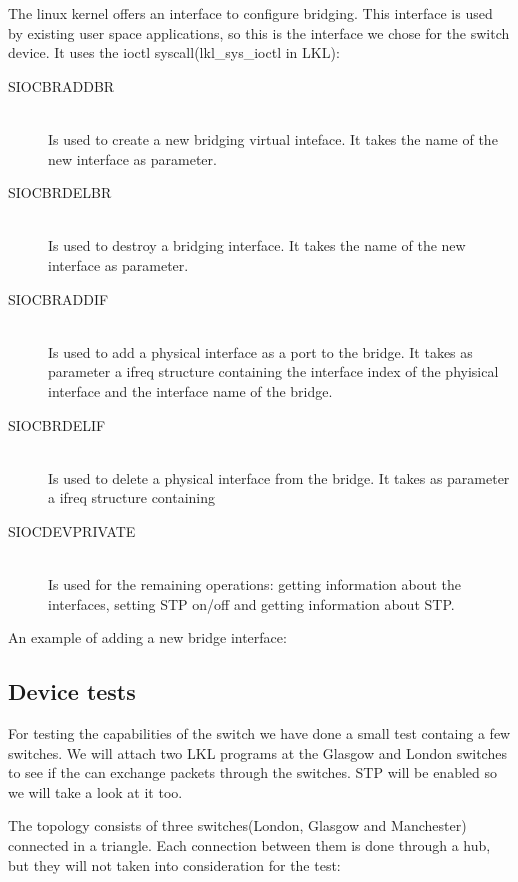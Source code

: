 The linux kernel offers an interface to configure bridging. This interface is used
by existing user space applications, so this is the interface we chose for the switch device. 
It uses the ioctl syscall(lkl_sys_ioctl in LKL):
\begin{description}
  \item[SIOCBRADDBR] \hfill \\
  Is used to create a new bridging virtual inteface. It takes the name of the new interface as parameter.
  \item[SIOCBRDELBR] \hfill \\
  Is used to destroy a bridging interface. It takes the name of the new interface as parameter.
  \item[SIOCBRADDIF] \hfill \\
  Is used to add a physical interface as a port to the bridge. It takes as parameter a ifreq structure containing
the interface index of the phyisical interface and the interface name of the bridge.
  \item[SIOCBRDELIF] \hfill \\
  Is used to delete a physical interface from the bridge. It takes as parameter a ifreq structure containing
  \item[SIOCDEVPRIVATE] \hfill \\
  Is used for the remaining operations: getting information about the interfaces, setting STP on/off and getting information
about STP.
\end{description}
An example of adding a new bridge interface:

\lstset{language=C,caption=Add bridge,label=lst:cbridgeadd}


\subsection{Device tests}
\label{sub-sec:switch-tests}

For testing the capabilities of the switch we have done a small test containg a few switches. We will attach two LKL programs at the Glasgow and London switches to see if the can exchange packets through the switches. STP will be enabled so we will take a look at it too.

The topology consists of three switches(London, Glasgow and Manchester) connected in a triangle. Each connection between them is done through a hub, but they will not taken into consideration for the test:


